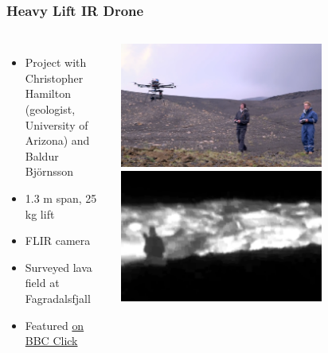 \documentclass[aspectratio=169]{rubeamer}
\newif\ifpause
\newcommand{\mypause}{\ifpause \pause \fi}
\begin{document}
\begin{frame}
  \frametitle{Heavy Lift IR Drone}
  \begin{columns}
    \begin{itemize}
      \item Project with Christopher Hamilton (geologist, University of Arizona) and Baldur Björnsson
      \mypause
      \item 1.3 m span, 25 kg lift
      \mypause
      \item FLIR camera
      \mypause
      \item Surveyed lava field at Fagradalsfjall
      \mypause
      \item Featured \href{https://youtu.be/6SIgFPhhRPE?t=1208}{\color{blue}on BBC Click}
    \end{itemize}
    \centering
    \onslide
    \includegraphics[width=0.7\textwidth]{ir_drone_in_flight}
    \includegraphics[width=0.7\textwidth]{ir_drone_ir_stillframe}
  \end{columns}
\end{frame}
\end{document}
